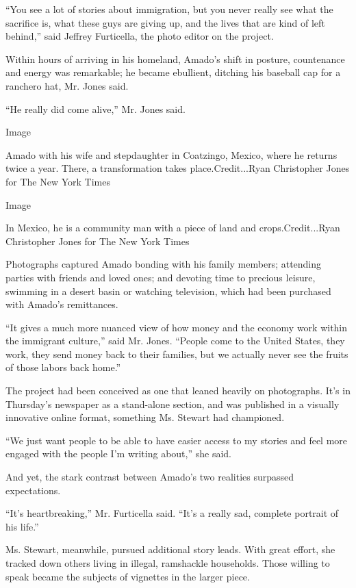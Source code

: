 ``You see a lot of stories about immigration, but you never really see
what the sacrifice is, what these guys are giving up, and the lives that
are kind of left behind,'' said Jeffrey Furticella, the photo editor on
the project.

Within hours of arriving in his homeland, Amado's shift in posture,
countenance and energy was remarkable; he became ebullient, ditching his
baseball cap for a ranchero hat, Mr. Jones said.

``He really did come alive,'' Mr. Jones said.

Image

Amado with his wife and stepdaughter in Coatzingo, Mexico, where he
returns twice a year. There, a transformation takes place.Credit...Ryan
Christopher Jones for The New York Times

Image

In Mexico, he is a community man with a piece of land and
crops.Credit...Ryan Christopher Jones for The New York Times

Photographs captured Amado bonding with his family members; attending
parties with friends and loved ones; and devoting time to precious
leisure, swimming in a desert basin or watching television, which had
been purchased with Amado's remittances.

``It gives a much more nuanced view of how money and the economy work
within the immigrant culture,'' said Mr. Jones. ``People come to the
United States, they work, they send money back to their families, but we
actually never see the fruits of those labors back home.''

The project had been conceived as one that leaned heavily on
photographs. It's in Thursday's newspaper as a stand-alone section, and
was published in a visually innovative online format, something Ms.
Stewart had championed.

``We just want people to be able to have easier access to my stories and
feel more engaged with the people I'm writing about,'' she said.

And yet, the stark contrast between Amado's two realities surpassed
expectations.

``It's heartbreaking,'' Mr. Furticella said. ``It's a really sad,
complete portrait of his life.''

Ms. Stewart, meanwhile, pursued additional story leads. With great
effort, she tracked down others living in illegal, ramshackle
households. Those willing to speak became the subjects of vignettes in
the larger piece.

